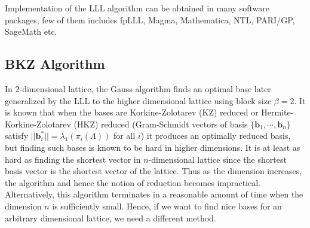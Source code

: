 Implementation of the LLL algorithm can be obtained in many software packages, few of them includes fpLLL\cite{fplll}, Magma\cite{MR1484478}, Mathematica\cite{Mathematica}, NTL\cite{Shoup_LLL}, PARI/GP\cite{PARI2}, SageMath\cite{sagemath} etc.





\subsection{BKZ Algorithm} In $2$-dimensional lattice, the Gauss algorithm finds an optimal base later generalized by the LLL to the higher dimensional lattice using block size $\beta=2$.
It is known that when the bases are Korkine-Zolotarev (KZ) reduced \cite{korkine1873formes} or Hermite-Korkine-Zolotarev (HKZ) reduced (Gram-Schmidt vectors of basis $\{\pmb{b}_1,\cdots,\pmb{b}_n\}$ satisfy $||\pmb{b}_i^*||=\lambda_1(\pi_i(\Lambda))$ for all $i$) it produces an optimally reduced basis, but finding such bases is known to be hard in higher dimensions.
It is at least as hard as finding the shortest vector in $n$-dimensional lattice since the shortest basis vector is the shortest vector of the lattice.
Thus as the dimension increases, the algorithm and hence the notion of reduction becomes impractical.
Alternatively, this algorithm terminates in a reasonable amount of time when the dimension $n$ is sufficiently small.
Hence, if we want to find nice bases for an arbitrary dimensional lattice, we need a different method.


